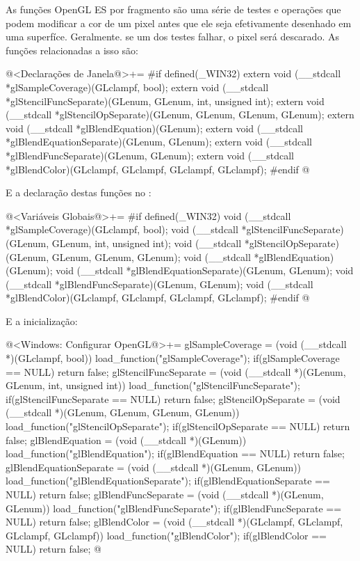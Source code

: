 As funções OpenGL ES por fragmento são uma série de testes e operações
que podem modificar a cor de um pixel antes que ele seja efetivamente
desenhado em uma superfíce. Geralmente. se um dos testes falhar, o
pixel será descarado. As funções relacionadas a isso são:

\iniciocodigo
@<Declarações de Janela@>+=
#if defined(_WIN32)
extern void (__stdcall *glSampleCoverage)(GLclampf, bool);
extern void (__stdcall *glStencilFuncSeparate)(GLenum, GLenum, int, unsigned int);
extern void (__stdcall *glStencilOpSeparate)(GLenum, GLenum, GLenum, GLenum);
extern void (__stdcall *glBlendEquation)(GLenum);
extern void (__stdcall *glBlendEquationSeparate)(GLenum, GLenum);
extern void (__stdcall *glBlendFuncSeparate)(GLenum, GLenum);
extern void (__stdcall *glBlendColor)(GLclampf, GLclampf, GLclampf, GLclampf);
#endif
@
\fimcodigo

E a declaração destas funções no :

\iniciocodigo
@<Variáveis Globais@>+=
#if defined(_WIN32)
void (__stdcall *glSampleCoverage)(GLclampf, bool);
void (__stdcall *glStencilFuncSeparate)(GLenum, GLenum, int, unsigned int);
void (__stdcall *glStencilOpSeparate)(GLenum, GLenum, GLenum, GLenum);
void (__stdcall *glBlendEquation)(GLenum);
void (__stdcall *glBlendEquationSeparate)(GLenum, GLenum);
void (__stdcall *glBlendFuncSeparate)(GLenum, GLenum);
void (__stdcall *glBlendColor)(GLclampf, GLclampf, GLclampf, GLclampf);
#endif
@
\fimcodigo

E a inicialização:

\iniciocodigo
@<Windows: Configurar OpenGL@>+=
glSampleCoverage = (void (__stdcall *)(GLclampf, bool))
                        load_function("glSampleCoverage");
if(glSampleCoverage == NULL) return false;
glStencilFuncSeparate = (void (__stdcall *)(GLenum, GLenum, int, unsigned int))
                           load_function("glStencilFuncSeparate");
if(glStencilFuncSeparate == NULL) return false;
glStencilOpSeparate = (void (__stdcall *)(GLenum, GLenum, GLenum, GLenum))
                         load_function("glStencilOpSeparate");
if(glStencilOpSeparate == NULL) return false;
glBlendEquation = (void (__stdcall *)(GLenum)) load_function("glBlendEquation");
if(glBlendEquation == NULL) return false;
glBlendEquationSeparate = (void (__stdcall *)(GLenum, GLenum))
                            load_function("glBlendEquationSeparate");
if(glBlendEquationSeparate == NULL) return false;
glBlendFuncSeparate = (void (__stdcall *)(GLenum, GLenum))
                        load_function("glBlendFuncSeparate");
if(glBlendFuncSeparate == NULL) return false;
glBlendColor = (void (__stdcall *)(GLclampf, GLclampf, GLclampf, GLclampf))
                   load_function("glBlendColor");
if(glBlendColor == NULL) return false;
@
\fimcodigo


